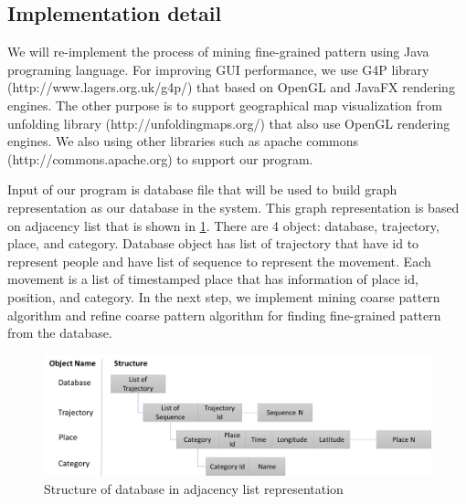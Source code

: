 \documentclass[conference]{IEEEtran}
\begin{document}
\subsection{Implementation detail}
We will re-implement the process of mining fine-grained pattern using Java programing language. For improving GUI performance, we use G4P library (http://www.lagers.org.uk/g4p/) that based on OpenGL and JavaFX rendering engines. The other purpose is to support geographical map visualization from unfolding library (http://unfoldingmaps.org/) that also use OpenGL rendering engines. We also using other libraries such as apache commons (http://commons.apache.org) to support our program. 
\par 
Input of our program is database file that will be used to build graph representation as our database in the system. This graph representation is based on adjacency list that is shown in \ref{fig:adjacency}. There are 4 object: database, trajectory, place, and category. Database object has list of trajectory that have id to represent people and have list of sequence to represent the movement. Each movement is a list of timestamped place that has information of place id, position, and category. In the next step, we implement mining coarse pattern algorithm and refine coarse pattern algorithm for finding fine-grained pattern from the database. 
\begin{figure}[!h]
	\centering
	\includegraphics[width=1\linewidth]{adjacency}
	\caption{Structure of database in adjacency list representation}
	\label{fig:adjacency}
\end{figure}
\end{document}
